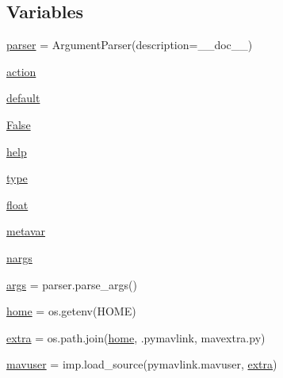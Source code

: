 \subsection*{Variables}
\begin{DoxyCompactItemize}
\item 
\mbox{\hyperlink{namespacepymavlink_1_1tools_1_1mavgpslag_abb0d882d3a0f5fc7846834c903d1f0d8}{parser}} = Argument\+Parser(description=\+\_\+\+\_\+doc\+\_\+\+\_\+)
\item 
\mbox{\hyperlink{namespacepymavlink_1_1tools_1_1mavgpslag_a781ed3df690ef65f259d5a228f8c0e8c}{action}}
\item 
\mbox{\hyperlink{namespacepymavlink_1_1tools_1_1mavgpslag_a4c27ec5b7da25f8ab0b5b3715485505d}{default}}
\item 
\mbox{\hyperlink{namespacepymavlink_1_1tools_1_1mavgpslag_abb466409ddd003bb8b05c555b3547816}{False}}
\item 
\mbox{\hyperlink{namespacepymavlink_1_1tools_1_1mavgpslag_a4b80249a372c47e275099e9081cda5cd}{help}}
\item 
\mbox{\hyperlink{namespacepymavlink_1_1tools_1_1mavgpslag_a1ac3c1666aa73ae9d145485df40520f3}{type}}
\item 
\mbox{\hyperlink{namespacepymavlink_1_1tools_1_1mavgpslag_ae1008ab86fe215c5b0af2b4d8f1013a0}{float}}
\item 
\mbox{\hyperlink{namespacepymavlink_1_1tools_1_1mavgpslag_aaae38cb4a05fdc0d20f4d07c4c04d3d7}{metavar}}
\item 
\mbox{\hyperlink{namespacepymavlink_1_1tools_1_1mavgpslag_a85b8bb2a28b64637a49cee3e19d5159d}{nargs}}
\item 
\mbox{\hyperlink{namespacepymavlink_1_1tools_1_1mavgpslag_a211b75a871dce5e90cf7b21c93ce4478}{args}} = parser.\+parse\+\_\+args()
\item 
\mbox{\hyperlink{namespacepymavlink_1_1tools_1_1mavgpslag_a7d947985d356bb2b85e842c2cc11efa5}{home}} = os.\+getenv(\textquotesingle{}H\+O\+ME\textquotesingle{})
\item 
\mbox{\hyperlink{namespacepymavlink_1_1tools_1_1mavgpslag_ac52ac91c0c51a00372c6261a1a0adbf7}{extra}} = os.\+path.\+join(\mbox{\hyperlink{namespacepymavlink_1_1tools_1_1mavgpslag_a7d947985d356bb2b85e842c2cc11efa5}{home}}, \textquotesingle{}.pymavlink\textquotesingle{}, \textquotesingle{}mavextra.\+py\textquotesingle{})
\item 
\mbox{\hyperlink{namespacepymavlink_1_1tools_1_1mavgpslag_a621711512b09f6681db4710c610295e8}{mavuser}} = imp.\+load\+\_\+source(\textquotesingle{}pymavlink.\+mavuser\textquotesingle{}, \mbox{\hyperlink{namespacepymavlink_1_1tools_1_1mavgpslag_ac52ac91c0c51a00372c6261a1a0adbf7}{extra}})
\end{DoxyCompactItemize}


